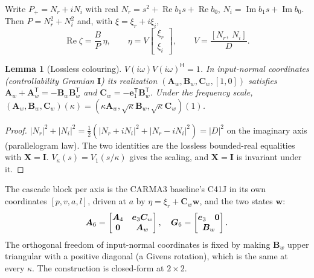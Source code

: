 \documentclass[conference]{IEEEtran}
\DeclareRobustCommand{\vct}[1]{\bm{#1}}
\DeclareRobustCommand{\mat}[1]{\bm{#1}}
\newcommand{\Hr}{^{\mathsf H}}
\newcommand{\T}{^{\mathsf T}}
\renewcommand{\Re}{\operatorname{Re}}
\renewcommand{\Im}{\operatorname{Im}}
\theoremstyle{bodysmall}
\newtheorem{lemma}{Lemma}
\begin{document}
Write $P_+=N_r+iN_i$ with real $N_r=s^2+\Re b_1s+\Re b_0$,
$N_i=\Im b_1s+\Im b_0$. Then $P=N_r^2+N_i^2$ and, with $\xi=\xi_r+i\xi_i$,
\begin{equation}
\Re\zeta=\frac{B}{P}\,\eta,\qquad \eta=V\begin{bmatrix}\xi_r\\\xi_i\end{bmatrix},\qquad
V=\frac{[N_r,\ N_i]}{D}.
\label{eq:cascade}
\end{equation}
\begin{lemma}[Lossless colouring]
\label{lem:coinner}
$V(i\omega)V(i\omega)\Hr=1$. In input-normal coordinates (controllability
Gramian $\mat I$) its realization $(\mat A_w,\mat B_w,\mat C_w,[1,0])$
satisfies $\mat A_w+\mat A_w\T=-\mat B_w\mat B_w\T$ and
$\mat C_w=-\vct e_1\T\mat B_w\T$. Under the frequency scale,
$(\mat A_w,\mat B_w,\mat C_w)(\kappa)=(\kappa\mat A_w,\sqrt\kappa\mat B_w,\sqrt\kappa\mat C_w)(1)$.
\end{lemma}
\begin{proof}
$|N_r|^2+|N_i|^2=\tfrac12(|N_r+iN_i|^2+|N_r-iN_i|^2)=|D|^2$ on the imaginary
axis (parallelogram law). The two identities are the lossless bounded-real
equalities with $\mat X=\mat I$. $V_\kappa(s)=V_1(s/\kappa)$ gives the
scaling, and $\mat X=\mat I$ is invariant under it.
\end{proof}
The cascade block per axis is the CARMA3 baseline's C41J in its own
coordinates $[p,v,a,l]$, driven at $a$ by $\eta=\xi_r+\mat C_w\vct w$, and
the two states $\vct w$:
\begin{equation}
\mat A_6=\begin{bmatrix}\mat A_4&\vct e_3\mat C_w\\\mat0&\mat A_w\end{bmatrix},\quad
\mat G_6=\begin{bmatrix}\vct e_3&\vct0\\\multicolumn{2}{c}{\mat B_w}\end{bmatrix}.
\end{equation}
The orthogonal freedom of input-normal coordinates is fixed by making
$\mat B_w$ upper triangular with a positive diagonal (a Givens rotation),
which is the same at every $\kappa$. The construction is closed-form at
$2\times2$.
\end{document}
